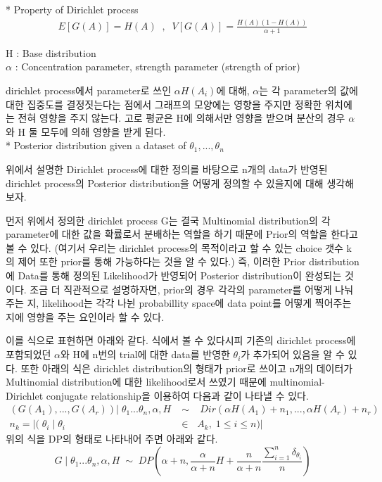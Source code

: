 \documentclass[a4paper]{oblivoir}
\begin{document}
* Property of Dirichlet process
\begin{eqnarray}
E[G(A)] = H(A)\;\;,\;\;V[G(A)] =\frac{H(A)(1-H(A))}{\alpha+1}
\end{eqnarray}
\begin{center}
H : Base distribution\\
$\alpha$ : Concentration parameter, strength parameter (strength of prior)
\end{center}

dirichlet process에서 parameter로 쓰인 $\alpha H(A_{i})$에 대해, $\alpha$는 각 parameter의 값에 대한 집중도를 결정짓는다는 점에서 그래프의 모양에는 영향을 주지만 정확한 위치에는 전혀 영향을 주지 않는다. 고로 평균은 H에 의해서만 영향을 받으며 분산의 경우 $\alpha$와 H 둘 모두에 의해 영향을 받게 된다. \\


* Posterior distribution given a dataset of $\theta_{1},...,\theta_{n}$

위에서 설명한 Dirichlet process에 대한 정의를 바탕으로 n개의 data가 반영된 dirichlet process의 Posterior distribution을 어떻게 정의할 수 있을지에 대해 생각해보자. 

먼저 위에서 정의한 dirichlet process G는 결국 Multinomial distribution의 각 parameter에 대한 값을 확률로서 분배하는 역할을 하기 때문에 Prior의 역할을 한다고 볼 수 있다. (여기서 우리는 dirichlet process의 목적이라고 할 수 있는 choice 갯수 k의 제어 또한 prior를 통해 가능하다는 것을 알 수 있다.) 즉, 이러한 Prior distribution에 Data를 통해 정의된 Likelihood가 반영되어 Posterior distribution이 완성되는 것이다. 조금 더 직관적으로 설명하자면, prior의 경우 각각의 parameter를 어떻게 나눠주는 지, likelihood는 각각 나뉜 probabillity space에 data point를 어떻게 찍어주는 지에 영향을 주는 요인이라 할 수 있다. 

이를 식으로 표현하면 아래와 같다. 식에서 볼 수 있다시피 기존의 dirichlet process에 포함되었던 $\alpha$와 H에 n번의 trial에 대한 data를 반영한 $\theta_{i}$가 추가되어 있음을 알 수 있다. 또한 아래의 식은 dirichlet distribution의 형태가 prior로 쓰이고 n개의 데이터가 Multinomial distribution에 대한 likelihood로서 쓰였기 때문에 multinomial-Dirichlet conjugate relationship을 이용하여 다음과 같이 나타낼 수 있다. 
\begin{eqnarray}
(G(A_{1}),...,G(A_{r}))|\;\theta_{1}...\theta_{n},\alpha,H \;&\sim&\; Dir(\alpha H(A_{1})+n_{1},...,\alpha H(A_{r})+n_{r})\nonumber\\
n_{k} = |(\;\theta_{i}\;|\;\theta_{i}&\in& A_{k}, \;1 \leq i \leq n)|
\end{eqnarray}
위의 식을 DP의 형태로 나타내어 주면 아래와 같다.
\begin{equation}
G\;|\;\theta_{1}...\theta_{n},\alpha,H\;\sim\;DP(\alpha+n , \frac{\alpha}{\alpha+n}H+\frac{n}{\alpha+n}\frac{\sum^{n}_{i=1}\delta_{\theta_{i}}}{n})
\end{equation}
\end{document}
